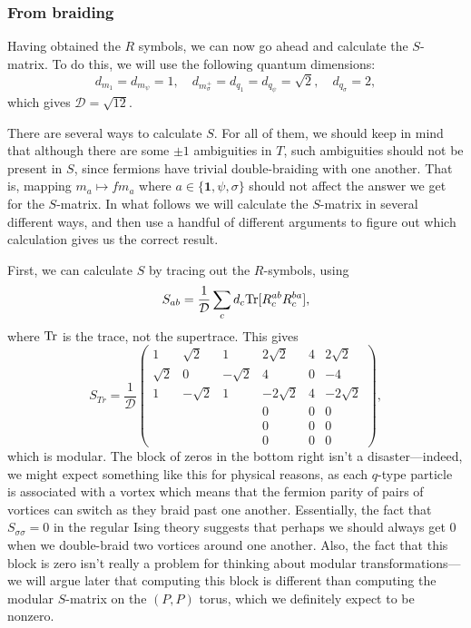 \documentclass[12pt,a4paper]{article}
\newcommand{\unit}{\mathbf{1}}
\newcommand{\mcd}{\mathcal{D}}
\newcommand\be            {\begin{equation}}
\newcommand\ee            {\end{equation}}
\begin{document}
{{\subsubsection{From braiding}

Having obtained the $R$ symbols, we can now go ahead and calculate the $S$-matrix. To do this, we will use the following quantum dimensions: 
\be d_{m_1} = d_{m_\psi} = 1,\quad d_{m_\sigma^+} = d_{q_1} = d_{q_\psi} = \sqrt{2},\quad d_{q_\sigma} = 2,\ee
which gives $\mcd = \sqrt{12}$.

There are several ways to calculate $S$. For all of them, we should keep in mind that although there are some $\pm1$ ambiguities in $T$, such ambiguities should not be present in $S$, since fermions have trivial double-braiding with one another. That is, mapping $m_a \mapsto fm_a$ where $a\in \{\unit,\psi,\sigma\}$ should not affect the answer we get for the $S$-matrix. In what follows we will calculate the $S$-matrix in several different ways, and then use a handful of different arguments to figure out which calculation gives us the correct result. 

First, we can calculate $S$ by tracing out the $R$-symbols, using 
\be S_{ab} = \frac{1}{\mcd}\sum_{c}d_c{\rm Tr}[R^{ab}_cR^{ba}_c],\ee
where ${\rm Tr}$ is the trace, not the supertrace. This gives 
\be 
 S_{Tr} = \frac{1}{\mcd} \begin{pmatrix} 
1&\sqrt{2}&1&2\sqrt{2}&4&2\sqrt{2} \\
 \sqrt{2}&0&-\sqrt{2}&4&0&-4 \\ 
 1&-\sqrt{2}&1&-2\sqrt{2}&4&-2\sqrt{2} \\ 
 &&&0&0&0 \\ 
 &&&0&0&0 \\ 
 &&&0 & 0 & 0 \end{pmatrix}, \ee
 which is modular. The block of zeros in the bottom right isn't a disaster---indeed, we might expect something like this for physical reasons, as each $q$-type particle is associated with a vortex which means that the fermion parity of pairs of vortices can switch as they braid past one another. Essentially, the fact that $S_{\sigma\sigma}=0$ in the regular Ising theory suggests that perhaps we should always get $0$ when we double-braid two vortices around one another. Also, the fact that this block is zero isn't really a problem for thinking about modular transformations---we will argue later that computing this block is different than computing the modular $S$-matrix on the $(P,P)$ torus, which we definitely expect to be nonzero. 
 
}}
\end{document}
